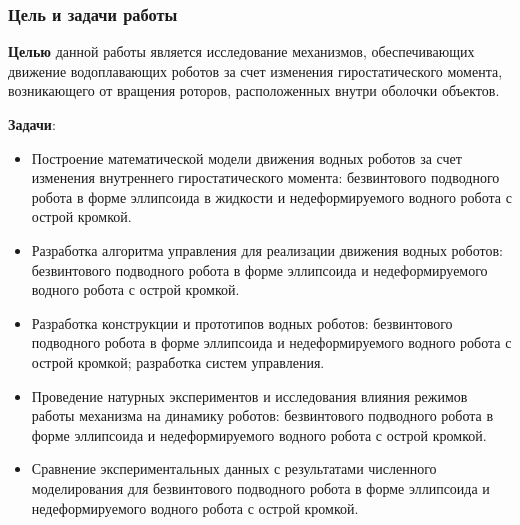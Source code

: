 \begin{frame}
\frametitle{Цель и задачи работы}
\footnotesize

\quad \textbf{Целью} данной работы является исследование механизмов, обеспечивающих движение водоплавающих роботов за счет изменения гиростатического момента, возникающего от вращения роторов, расположенных внутри оболочки объектов.

\textbf{Задачи}:
\begin{itemize}
	\item Построение математической модели движения водных роботов за счет изменения внутреннего гиростатического момента: безвинтового подводного робота в форме эллипсоида в жидкости и недеформируемого водного робота с острой кромкой.
	\item Разработка алгоритма управления для реализации движения водных роботов: безвинтового подводного робота в форме эллипсоида и недеформируемого водного робота с острой кромкой.
	\item Разработка конструкции и прототипов водных роботов: безвинтового подводного робота в форме эллипсоида и недеформируемого водного робота с острой кромкой; разработка систем управления.
	\item Проведение натурных экспериментов и исследования влияния режимов работы механизма на динамику роботов: безвинтового подводного робота в форме эллипсоида и недеформируемого водного робота с острой кромкой.
	\item Сравнение экспериментальных данных с результатами численного моделирования для безвинтового подводного робота в форме эллипсоида и недеформируемого водного робота с острой кромкой.
\end{itemize}
\end{frame}

